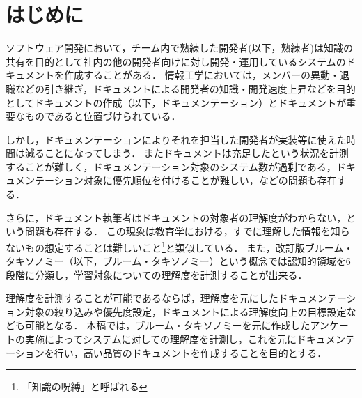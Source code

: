 \section{はじめに}
ソフトウェア開発において，チーム内で熟練した開発者(以下，熟練者)は知識の共有を目的として社内の他の開発者向けに対し開発・運用しているシステムのドキュメントを作成することがある．
情報工学においては，メンバーの異動・退職などの引き継ぎ，ドキュメントによる開発者の知識・開発速度上昇などを目的としてドキュメントの作成（以下，ドキュメンテーション）とドキュメントが重要なものであると位置づけられている\cite{bib:ozawa}．

しかし，ドキュメンテーションによりそれを担当した開発者が実装等に使えた時間は減ることになってしまう．
またドキュメントは充足したという状況を計測することが難しく，ドキュメンテーション対象のシステム数が過剰である，ドキュメンテーション対象に優先順位を付けることが難しい，などの問題も存在する．

さらに，ドキュメント執筆者はドキュメントの対象者の理解度がわからない，という問題も存在する．
この現象は教育学における，すでに理解した情報を知らないもの想定することは難しいこと\footnote{「知識の呪縛」と呼ばれる}\cite{bib:kaneda}と類似している．
また，改訂版ブルーム・タキソノミー（以下，ブルーム・タキソノミー）という概念では認知的領域を6段階に分類し，学習対象についての理解度を計測することが出来る．

理解度を計測することが可能であるならば，理解度を元にしたドキュメンテーション対象の絞り込みや優先度設定，ドキュメントによる理解度向上の目標設定なども可能となる．
本稿では，ブルーム・タキソノミーを元に作成したアンケートの実施によってシステムに対しての理解度を計測し，これを元にドキュメンテーションを行い，高い品質のドキュメントを作成することを目的とする．
